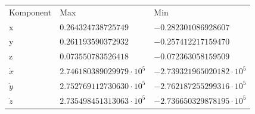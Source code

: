 \documentclass[a4paper]{article}
\begin{document}
\begin{figure}[H]
\begin{centering}
  \end{centering}
\end{figure}

\begin{table}[H]
  \centering
  \begin{tabular}{l l l}
    Komponent & Max & Min \\
    x & $0.264324738725749$ & $ -0.282301086928607$\\
    y & $0.261193590372932$ & $ -0.257412217159470$\\
    z & $0.073550783526418$ & $ -0.072363058159509$\\
    $\dot{x}$ & $2.746180389029979 \cdot 10^5$ & $-2.739321965020182 \cdot 10^5$\\
    $\dot{y}$ & $2.752769112730630 \cdot 10^5$ & $-2.762187255299316 \cdot 10^5$\\
    $\dot{z}$ & $2.735498451313063 \cdot 10^5$ & $-2.736650329878195 \cdot 10^5$\\
  \end{tabular}
\end{table}
\end{document}
